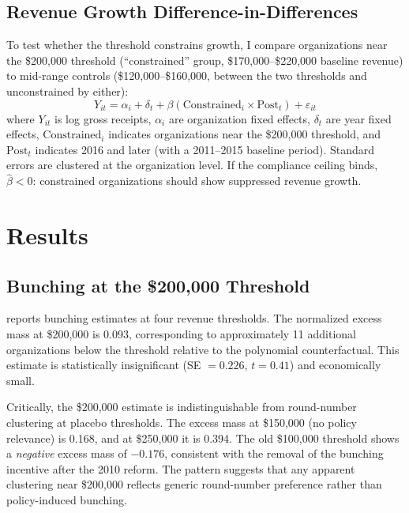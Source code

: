 \documentclass[12pt]{article}
\begin{document}
\subsection{Revenue Growth Difference-in-Differences}

To test whether the threshold constrains growth, I compare organizations near the \$200,000 threshold (``constrained'' group, \$170,000--\$220,000 baseline revenue) to mid-range controls (\$120,000--\$160,000, between the two thresholds and unconstrained by either):
\begin{equation}
Y_{it} = \alpha_i + \delta_t + \beta (\text{Constrained}_i \times \text{Post}_t) + \varepsilon_{it}
\label{eq:did}
\end{equation}
where $Y_{it}$ is log gross receipts, $\alpha_i$ are organization fixed effects, $\delta_t$ are year fixed effects, $\text{Constrained}_i$ indicates organizations near the \$200,000 threshold, and $\text{Post}_t$ indicates 2016 and later (with a 2011--2015 baseline period). Standard errors are clustered at the organization level. If the compliance ceiling binds, $\hat{\beta} < 0$: constrained organizations should show suppressed revenue growth.


\section{Results}
\label{sec:results}

\subsection{Bunching at the \$200,000 Threshold}

 reports bunching estimates at four revenue thresholds. The normalized excess mass at \$200,000 is 0.093, corresponding to approximately 11 additional organizations below the threshold relative to the polynomial counterfactual. This estimate is statistically insignificant (SE $= 0.226$, $t = 0.41$) and economically small.

Critically, the \$200,000 estimate is indistinguishable from round-number clustering at placebo thresholds. The excess mass at \$150,000 (no policy relevance) is 0.168, and at \$250,000 it is 0.394. The old \$100,000 threshold shows a \textit{negative} excess mass of $-0.176$, consistent with the removal of the bunching incentive after the 2010 reform. The pattern suggests that any apparent clustering near \$200,000 reflects generic round-number preference rather than policy-induced bunching.
\end{document}
